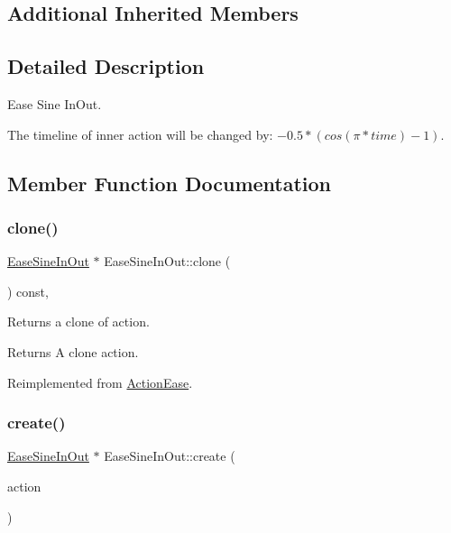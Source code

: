 \subsection*{Additional Inherited Members}


\subsection{Detailed Description}
Ease Sine In\+Out. 

The timeline of inner action will be changed by\+: $-0.5*(cos(\pi *time)-1)$. 

\subsection{Member Function Documentation}
\mbox{\label{classEaseSineInOut_a78a36c0d403d763d2d1c6a03a56a283c}} 
\subsubsection{\texorpdfstring{clone()}{clone()}}
{\footnotesize\ttfamily \hyperlink{classEaseSineInOut}{Ease\+Sine\+In\+Out} $\ast$ Ease\+Sine\+In\+Out\+::clone (\begin{DoxyParamCaption}\item[{void}]{ }\end{DoxyParamCaption}) const\hspace{0.3cm}{\ttfamily [override]}, {\ttfamily [virtual]}}

Returns a clone of action.

\begin{DoxyReturn}{Returns}
A clone action. 
\end{DoxyReturn}


Reimplemented from \hyperlink{classActionEase_a39bec93fe161fb732a74d8e51a2fe08b}{Action\+Ease}.

\mbox{\label{classEaseSineInOut_ace68076ff6bb84e0d1a52b40d8806685}} 
\subsubsection{\texorpdfstring{create()}{create()}}
{\footnotesize\ttfamily \hyperlink{classEaseSineInOut}{Ease\+Sine\+In\+Out} $\ast$ Ease\+Sine\+In\+Out\+::create (\begin{DoxyParamCaption}\item[{\hyperlink{classActionInterval}{Action\+Interval} $\ast$}]{action }\end{DoxyParamCaption})\hspace{0.3cm}{\ttfamily [static]}}



